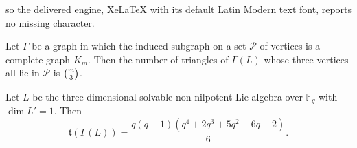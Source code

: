 \documentclass[10pt,a4paper]{amsart}
\def\F{\mathbb{F}}
\begin{document}
so the delivered engine, XeLaTeX with its default Latin Modern text font, reports no missing character.
\begin{lemma}\label{T3P}
Let $\Gamma$ be a graph in which the induced subgraph on a set $\mathcal{P}$ of vertices is a complete graph $K_{m}$.  Then the number of triangles of $\Gamma(L)$ whose three vertices all lie in $\mathcal{P}$ is $\tbinom{m}{3}$.
\end{lemma}

\begin{proposition}\label{B2}
Let $L$ be the three-dimensional solvable non-nilpotent Lie algebra over $\F_q$ with $\dim L'=1$. Then
\[\mathfrak{t}(\Gamma(L)) = \frac{q(q+1)(q^4+2q^3+5q^2-6q-2)}{6}.\]

\end{proposition}
\end{document}
